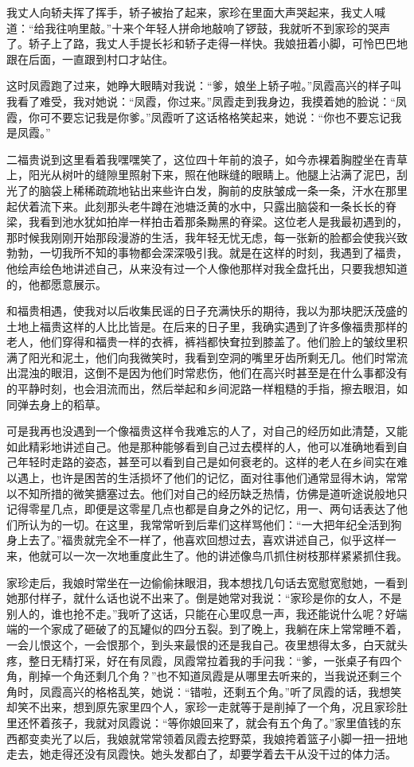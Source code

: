 \documentclass[12pt,UTF8]{ctexbook}
\begin{document}
我丈人向轿夫挥了挥手，轿子被抬了起来，家珍在里面大声哭起来，我丈人喊道：“给我往响里敲。”十来个年轻人拼命地敲响了锣鼓，我就听不到家珍的哭声了。轿子上了路，我丈人手提长衫和轿子走得一样快。我娘扭着小脚，可怜巴巴地跟在后面，一直跟到村口才站住。

这时凤霞跑了过来，她睁大眼睛对我说：“爹，娘坐上轿子啦。”凤霞高兴的样子叫我看了难受，我对她说：“凤霞，你过来。”凤霞走到我身边，我摸着她的脸说：“凤霞，你可不要忘记我是你爹。”凤霞听了这话格格笑起来，她说：“你也不要忘记我是凤霞。”

二福贵说到这里看着我嘿嘿笑了，这位四十年前的浪子，如今赤裸着胸膛坐在青草上，阳光从树叶的缝隙里照射下来，照在他眯缝的眼睛上。他腿上沾满了泥巴，刮光了的脑袋上稀稀疏疏地钻出来些许白发，胸前的皮肤皱成一条一条，汗水在那里起伏着流下来。此刻那头老牛蹲在池塘泛黄的水中，只露出脑袋和一条长长的脊梁，我看到池水犹如拍岸一样拍击着那条黝黑的脊梁。这位老人是我最初遇到的，那时候我刚刚开始那段漫游的生活，我年轻无忧无虑，每一张新的脸都会使我兴致勃勃，一切我所不知的事物都会深深吸引我。就是在这样的时刻，我遇到了福贵，他绘声绘色地讲述自己，从来没有过一个人像他那样对我全盘托出，只要我想知道的，他都愿意展示。

和福贵相遇，使我对以后收集民谣的日子充满快乐的期待，我以为那块肥沃茂盛的土地上福贵这样的人比比皆是。在后来的日子里，我确实遇到了许多像福贵那样的老人，他们穿得和福贵一样的衣裤，裤裆都快耷拉到膝盖了。他们脸上的皱纹里积满了阳光和泥土，他们向我微笑时，我看到空洞的嘴里牙齿所剩无几。他们时常流出混浊的眼泪，这倒不是因为他们时常悲伤，他们在高兴时甚至是在什么事都没有的平静时刻，也会泪流而出，然后举起和乡间泥路一样粗糙的手指，擦去眼泪，如同弹去身上的稻草。

可是我再也没遇到一个像福贵这样令我难忘的人了，对自己的经历如此清楚，又能如此精彩地讲述自己。他是那种能够看到自己过去模样的人，他可以准确地看到自己年轻时走路的姿态，甚至可以看到自己是如何衰老的。这样的老人在乡间实在难以遇上，也许是困苦的生活损坏了他们的记忆，面对往事他们通常显得木讷，常常以不知所措的微笑搪塞过去。他们对自己的经历缺乏热情，仿佛是道听途说般地只记得零星几点，即便是这零星几点也都是自身之外的记忆，用一、两句话表达了他们所认为的一切。在这里，我常常听到后辈们这样骂他们：“一大把年纪全活到狗身上去了。”福贵就完全不一样了，他喜欢回想过去，喜欢讲述自己，似乎这样一来，他就可以一次一次地重度此生了。他的讲述像鸟爪抓住树枝那样紧紧抓住我。

家珍走后，我娘时常坐在一边偷偷抹眼泪，我本想找几句话去宽慰宽慰她，一看到她那付样子，就什么话也说不出来了。倒是她常对我说：“家珍是你的女人，不是别人的，谁也抢不走。”我听了这话，只能在心里叹息一声，我还能说什么呢？好端端的一个家成了砸破了的瓦罐似的四分五裂。到了晚上，我躺在床上常常睡不着，一会儿恨这个，一会恨那个，到头来最恨的还是我自己。夜里想得太多，白天就头疼，整日无精打采，好在有凤霞，凤霞常拉着我的手问我：“爹，一张桌子有四个角，削掉一个角还剩几个角？”也不知道凤霞是从哪里去听来的，当我说还剩三个角时，凤霞高兴的格格乱笑，她说：“错啦，还剩五个角。”听了凤霞的话，我想笑却笑不出来，想到原先家里四个人，家珍一走就等于是削掉了一个角，况且家珍肚里还怀着孩子，我就对凤霞说：“等你娘回来了，就会有五个角了。”家里值钱的东西都变卖光了以后，我娘就常常领着凤霞去挖野菜，我娘挎着篮子小脚一扭一扭地走去，她走得还没有凤霞快。她头发都白了，却要学着去干从没干过的体力活。
\end{document}
